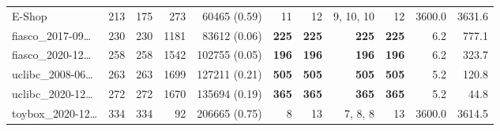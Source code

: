 \begin{table*}
\begin{tiny}
{{\begin{tabular}{lrrrrrrrrrr}
E-Shop & \num[text-series-to-math=true]{213} & \num[text-series-to-math=true]{175} & \num[text-series-to-math=true]{273} & \num[text-series-to-math=true]{60465} (\num[text-series-to-math=true]{0.59}) & \num[text-series-to-math=true]{11} & \num[text-series-to-math=true]{12} & \num[text-series-to-math=true]{9}, \num[text-series-to-math=true]{10}, \num[text-series-to-math=true]{10} & \num[text-series-to-math=true]{12} & 3600.0 & 3631.6\\
fiasco\_2017-09\ldots & \num[text-series-to-math=true]{230} & \num[text-series-to-math=true]{230} & \num[text-series-to-math=true]{1181} & \num[text-series-to-math=true]{83612} (\num[text-series-to-math=true]{0.06}) & \textbf{\num[text-series-to-math=true]{225}} & \textbf{\num[text-series-to-math=true]{225}} & \textbf{\num[text-series-to-math=true]{225}} & \textbf{\num[text-series-to-math=true]{225}} & 6.2 & 777.1\\
fiasco\_2020-12\ldots & \num[text-series-to-math=true]{258} & \num[text-series-to-math=true]{258} & \num[text-series-to-math=true]{1542} & \num[text-series-to-math=true]{102755} (\num[text-series-to-math=true]{0.05}) & \textbf{\num[text-series-to-math=true]{196}} & \textbf{\num[text-series-to-math=true]{196}} & \textbf{\num[text-series-to-math=true]{196}} & \textbf{\num[text-series-to-math=true]{196}} & 6.2 & 323.7\\
uclibc\_2008-06\ldots & \num[text-series-to-math=true]{263} & \num[text-series-to-math=true]{263} & \num[text-series-to-math=true]{1699} & \num[text-series-to-math=true]{127211} (\num[text-series-to-math=true]{0.21}) & \textbf{\num[text-series-to-math=true]{505}} & \textbf{\num[text-series-to-math=true]{505}} & \textbf{\num[text-series-to-math=true]{505}} & \textbf{\num[text-series-to-math=true]{505}} & 5.2 & 120.8\\
uclibc\_2020-12\ldots & \num[text-series-to-math=true]{272} & \num[text-series-to-math=true]{272} & \num[text-series-to-math=true]{1670} & \num[text-series-to-math=true]{135694} (\num[text-series-to-math=true]{0.19}) & \textbf{\num[text-series-to-math=true]{365}} & \textbf{\num[text-series-to-math=true]{365}} & \textbf{\num[text-series-to-math=true]{365}} & \textbf{\num[text-series-to-math=true]{365}} & 5.2 & 44.8\\
toybox\_2020-12\ldots & \num[text-series-to-math=true]{334} & \num[text-series-to-math=true]{334} & \num[text-series-to-math=true]{92} & \num[text-series-to-math=true]{206665} (\num[text-series-to-math=true]{0.75}) & \num[text-series-to-math=true]{8} & \num[text-series-to-math=true]{13} & \num[text-series-to-math=true]{7}, \num[text-series-to-math=true]{8}, \num[text-series-to-math=true]{8} & \num[text-series-to-math=true]{13} & 3600.0 & 3614.5\\

\end{tabular}}}
\end{tiny}
\end{table*}
